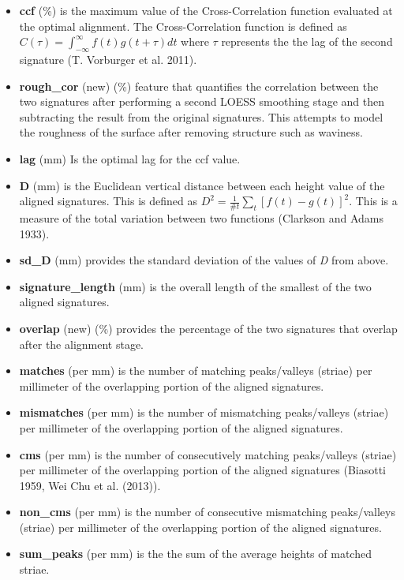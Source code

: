 \documentclass[12pt,]{article}
\providecommand{\tightlist}{%
  \setlength{\itemsep}{0pt}\setlength{\parskip}{0pt}}
\theoremstyle{definition}
\theoremstyle{definition}
\theoremstyle{definition}
\theoremstyle{remark}
\begin{document}
\begin{itemize}
\tightlist
\item
  \textbf{ccf} (\%) is the maximum value of the Cross-Correlation
  function evaluated at the optimal alignment. The Cross-Correlation
  function is defined as
  \(C(\tau) = \int_{-\infty}^{\infty} f(t)g(t + \tau)dt\) where \(\tau\)
  represents the the lag of the second signature (T. Vorburger et al.
  2011).
\item
  \textbf{rough\_cor} (new) (\%) feature that quantifies the correlation
  between the two signatures after performing a second LOESS smoothing
  stage and then subtracting the result from the original signatures.
  This attempts to model the roughness of the surface after removing
  structure such as waviness.
\item
  \textbf{lag} (mm) Is the optimal lag for the ccf value.
\item
  \textbf{D} (mm) is the Euclidean vertical distance between each height
  value of the aligned signatures. This is defined as
  \(D^2 = \frac{1}{\text{\#}t}\sum_t \left[f(t) - g(t)\right]^2\). This
  is a measure of the total variation between two functions (Clarkson
  and Adams 1933).
\item
  \textbf{sd\_D} (mm) provides the standard deviation of the values of
  \emph{D} from above.
\item
  \textbf{signature\_length} (mm) is the overall length of the smallest
  of the two aligned signatures.
\item
  \textbf{overlap} (new) (\%) provides the percentage of the two
  signatures that overlap after the alignment stage.
\item
  \textbf{matches} (per mm) is the number of matching peaks/valleys
  (striae) per millimeter of the overlapping portion of the aligned
  signatures.
\item
  \textbf{mismatches} (per mm) is the number of mismatching
  peaks/valleys (striae) per millimeter of the overlapping portion of
  the aligned signatures.
\item
  \textbf{cms} (per mm) is the number of consecutively matching
  peaks/valleys (striae) per millimeter of the overlapping portion of
  the aligned signatures (Biasotti 1959, Wei Chu et al. (2013)).
\item
  \textbf{non\_cms} (per mm) is the number of consecutive mismatching
  peaks/valleys (striae) per millimeter of the overlapping portion of
  the aligned signatures.
\item
  \textbf{sum\_peaks} (per mm) is the the sum of the average heights of
  matched striae.
\end{itemize}
\end{document}
